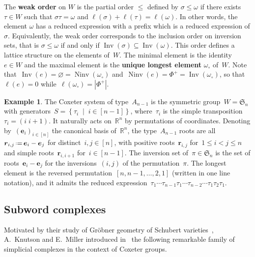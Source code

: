 \documentclass[reqno]{amsart}
\theoremstyle{definition}
\newtheorem{example}[theorem]{Example}
\newcommand{\R}{\mathbb{R}} %
\renewcommand{\b}[1]{\boldsymbol{#1}} %
\newcommand{\set}[2]{\left\{ #1 \;\middle|\; #2 \right\}} %
\newcommand{\eqdef}{\mbox{\,\raisebox{0.2ex}{\scriptsize\ensuremath{\mathrm:}}\ensuremath{=}\,}} %
\DeclareMathOperator{\Inv}{Inv} %
\DeclareMathOperator{\Ninv}{Ninv} %
\newcommand{\defn}[1]{\textbf{\textsf{\color{PineGreen} #1}}} %
\newcommand{\fS}{\mathfrak{S}} %
\newcommand{\wo}{\omega_\circ} %
\begin{document}
The \defn{weak order} on $W$ is the partial order $\le$ defined by $\sigma \leq \omega$ if there exists $\tau \in W$  such that $\sigma\tau = \omega$ and $\ell(\sigma) + \ell(\tau) = \ell(\omega)$.
In other words, the element $\omega$ has a reduced expression with a prefix which is a reduced expression of $\sigma$.
Equivalently, the weak order corresponds to the inclusion order on inversion sets, that is $\sigma \leq \omega$ if and only if $\Inv(\sigma) \subseteq \Inv(\omega)$.
This order defines a lattice structure on the elements of~$W$.
The minimal element is the identity $e \in W$ and the maximal element is the \defn{unique longest element} $\wo$ of~$W$.
Note that~$\Inv(e) = \varnothing = \Ninv(\wo)$ and~$\Ninv(e) = \Phi^+ = \Inv(\wo)$, so that~$\ell(e) = 0$ while~$\ell(\wo) = |\Phi^+|$.

\begin{example}
\label{exm:typeACoxeterSystem}
The Coxeter system of type~$A_{n-1}$ is the symmetric group~$W = \fS_n$ with generators~$S = \set{\tau_i}{i \in [n-1]}$, where~$\tau_i$ is the simple transposition~$\tau_i = (i \; i+1)$.
It naturally acts on~$\R^n$ by permutations of coordinates.
Denoting by~$(\b{e}_i)_{i \in [n]}$ the canonical basis of~$\R^n$, the type~$A_{n-1}$ roots are all~$\b{r}_{i,j} \eqdef \b{e}_i - \b{e}_j$ for distinct~$i,j \in [n]$, with positive roots~$\b{r}_{i,j}$ for~$1 \le i < j \le n$ and simple roots~$\b{r}_{i,i+1}$ for~$i \in [n-1]$.
The inversion set of~$\pi \in \fS_n$ is the set of roots~$\b{e}_i - \b{e}_j$ for the inversions~$(i,j)$ of the permutation~$\pi$.
The longest element is the reversed permutation~$[n, n-1, \dots, 2, 1]$ (written in one line notation), and it admits the reduced expression~$\tau_1 \cdots \tau_{n-1} \tau_1 \cdots \tau_{n-2} \cdots \tau_1 \tau_2 \tau_1$.
\end{example}


\subsection{Subword complexes}
\label{subsec:subwordComplexes}

Motivated by their study of Gröbner geometry of Schubert varieties~\cite{KnutsonMiller-GroebnerGeometry}, A.~Knutson and E.~Miller introduced in~\cite{KnutsonMiller-subwordComplex} the following remarkable family of simplicial complexes in the context of Coxeter groups.
\end{document}
